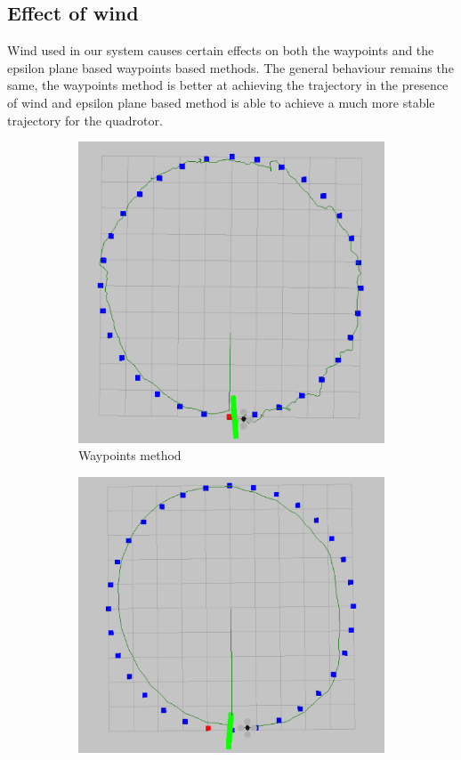 \documentclass[hidelinks,BTech]{iitmdiss}
\begin{document}
\subsection{Effect of wind}
Wind used in our system causes certain effects on both the waypoints and the epsilon plane based waypoints based methods. The general behaviour remains the same, the waypoints method is better at achieving the trajectory in the presence of wind and epsilon plane based method is able to achieve a much more stable trajectory for the quadrotor.
\begin{figure}[H]
  \centering
  \begin{subfigure}[t]{0.45\textwidth}
    \centering
      \includegraphics[width=\textwidth]{Waypoints_wind.png}
      \caption{Waypoints method}
  \end{subfigure}
  \begin{subfigure}[t]{0.49\textwidth}
    \centering
      \includegraphics[width=\textwidth]{Waypoints_0_9_wind.png}

\end{subfigure}
\end{figure}
\end{document}
